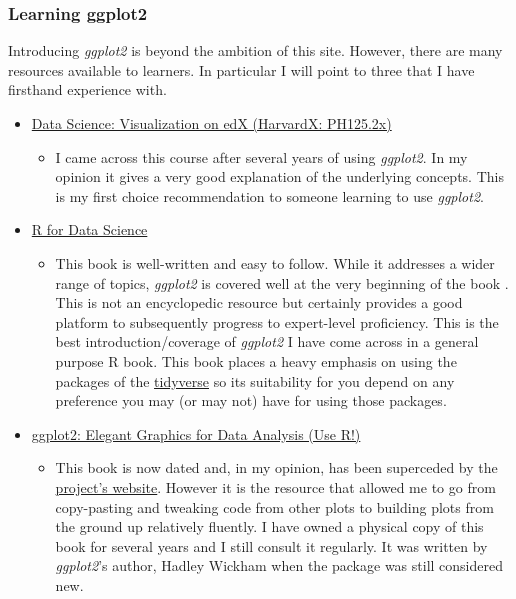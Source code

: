 \documentclass[]{book}
\providecommand{\tightlist}{%
  \setlength{\itemsep}{0pt}\setlength{\parskip}{0pt}}
\begin{document}
\hypertarget{ggplotlearn}{%
\subsubsection*{Learning ggplot2}\label{ggplotlearn}}

Introducing \emph{ggplot2} is beyond the ambition of this site.
However, there are many resources available to learners. In particular I will point to three
that I have firsthand experience with.

\begin{itemize}
\tightlist
\item
  \href{https://courses.edx.org/courses/course-v1:HarvardX+PH125.2x+2T2018/course/}{Data Science: Visualization on edX (HarvardX: PH125.2x)}

  \begin{itemize}
  \tightlist
  \item
    I came across this course after several years of using \emph{ggplot2}. In my opinion it gives a very good explanation of the underlying concepts. This is my first choice recommendation to someone learning to use \emph{ggplot2}.
  \end{itemize}
\item
  \href{https://r4ds.had.co.nz/}{R for Data Science}

  \begin{itemize}
  \tightlist
  \item
    This book is well-written and easy to follow. While it addresses a wider range of topics, \emph{ggplot2} is covered well at the very beginning of the book . This is not an encyclopedic resource but certainly provides a good platform to subsequently progress to expert-level proficiency. This is the best introduction/coverage of \emph{ggplot2} I have come across in a general purpose R book. This book places a heavy emphasis on using the packages of the \href{https://www.tidyverse.org/}{tidyverse} so its suitability for you depend on any preference you may (or may not) have for using those packages.
  \end{itemize}
\item
  \href{https://www.amazon.com/dp/0387981403/ref=cm_sw_su_dp}{ggplot2: Elegant Graphics for Data Analysis (Use R!)}

  \begin{itemize}
  \tightlist
  \item
    This book is now dated and, in my opinion, has been superceded by the \href{https://ggplot2.tidyverse.org/}{project's website}. However it is the resource that allowed me to go from copy-pasting and tweaking code from other plots to building plots from the ground up relatively fluently. I have owned a physical copy of this book for several years and I still consult it regularly. It was written by \emph{ggplot2}'s author, Hadley Wickham when the package was still considered new.
  \end{itemize}
\end{itemize}


\end{document}
